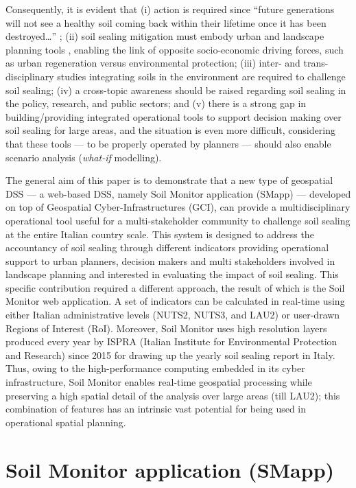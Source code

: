 \documentclass[APA,LATO1COL,doublespace]{WileyNJD-v2}
\begin{document}
Consequently, it is evident that 
(i) action is required since ``future generations will not see a healthy soil coming back within their lifetime once it has been destroyed\dots'' \citep{SWD12}; 
(ii) soil sealing mitigation must embody urban and landscape planning tools \citep{Artmann14}, enabling the link of opposite socio-economic driving forces, such as urban regeneration versus environmental protection; 
(iii) inter- and trans-disciplinary studies integrating soils in the environment are required to challenge soil sealing;
(iv) a cross-topic awareness should be raised regarding soil sealing in the policy, research, and public sectors; 
and (v) there is a strong gap in building/providing integrated operational tools to support decision making over soil sealing for large areas, and the situation is even more difficult, considering that these tools --- to be properly operated by planners --- should also enable scenario analysis (\textit{what-if} modelling).

The general aim of this paper is to demonstrate that a new type of geospatial DSS --- a web-based DSS, namely Soil Monitor application (SMapp) --- developed on top of Geospatial Cyber-Infrastructures (GCI), can provide a multidisciplinary operational tool useful for a multi-stakeholder community to challenge soil sealing at the entire Italian country scale. 
This system is designed to address the accountancy of soil sealing through different indicators providing operational support to urban planners, decision makers and multi stakeholders involved in landscape planning and interested in evaluating the impact of soil sealing. 
This specific contribution required a different approach, the result of which is the Soil Monitor web application. 
A set of indicators can be calculated in real-time using either Italian administrative levels (NUTS2, NUTS3, and LAU2) or user-drawn Regions of Interest (RoI). 
Moreover, Soil Monitor uses high resolution layers produced every year by ISPRA (Italian Institute for Environmental Protection and Research) since 2015 for drawing up the yearly soil sealing report in Italy. 
Thus, owing to the high-performance computing embedded in its cyber infrastructure, Soil Monitor enables real-time geospatial processing while preserving a high spatial detail of the analysis over large areas (till LAU2); this combination of features has an intrinsic vast potential for being used in operational spatial planning. 

\section{Soil Monitor application (SMapp)}
\end{document}
